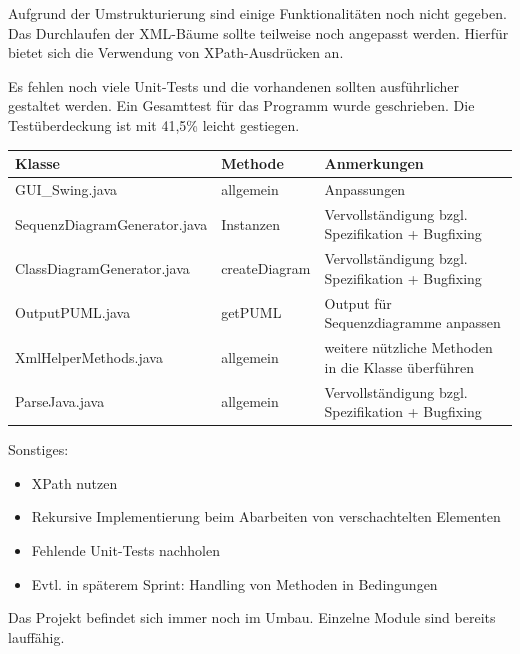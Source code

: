 Aufgrund der Umstrukturierung sind einige Funktionalitäten noch nicht gegeben. Das Durchlaufen der XML-Bäume sollte teilweise noch angepasst werden. Hierfür bietet sich die Verwendung von XPath-Ausdrücken an.
\nsecend%

Es fehlen noch viele Unit-Tests und die vorhandenen sollten ausführlicher gestaltet werden.
Ein Gesamttest für das Programm wurde geschrieben.
Die Testüberdeckung ist mit 41,5\% leicht gestiegen.
\nsecend%

\begin{table}[H]

\begin{tabularx}{\textwidth}{ |l|l|X| }
\hline
\textbf{Klasse} & \textbf{Methode} & \textbf{Anmerkungen}\\
 \hline
 GUI\_Swing.java & allgemein & Anpassungen\\
 \hline
 SequenzDiagramGenerator.java & Instanzen & Vervollständigung bzgl. Spezifikation + Bugfixing\\
 \hline
 ClassDiagramGenerator.java & createDiagram & Vervollständigung bzgl. Spezifikation + Bugfixing\\
 \hline
 OutputPUML.java & getPUML & Output für Sequenzdiagramme anpassen\\
 \hline
 XmlHelperMethods.java & allgemein & weitere nützliche Methoden in die Klasse überführen\\
 \hline
 ParseJava.java & allgemein & Vervollständigung bzgl. Spezifikation + Bugfixing\\
\hline
\end{tabularx}
\end{table}

Sonstiges:
\begin{itemize}
\item XPath nutzen
\item Rekursive Implementierung beim Abarbeiten von verschachtelten Elementen
\item Fehlende Unit-Tests nachholen
\item Evtl. in späterem Sprint: Handling von Methoden in Bedingungen
\end{itemize}
\nsecend%


\nsecend%

Das Projekt befindet sich immer noch im Umbau. Einzelne Module sind bereits lauffähig.
\nsecend%


\nsecend%